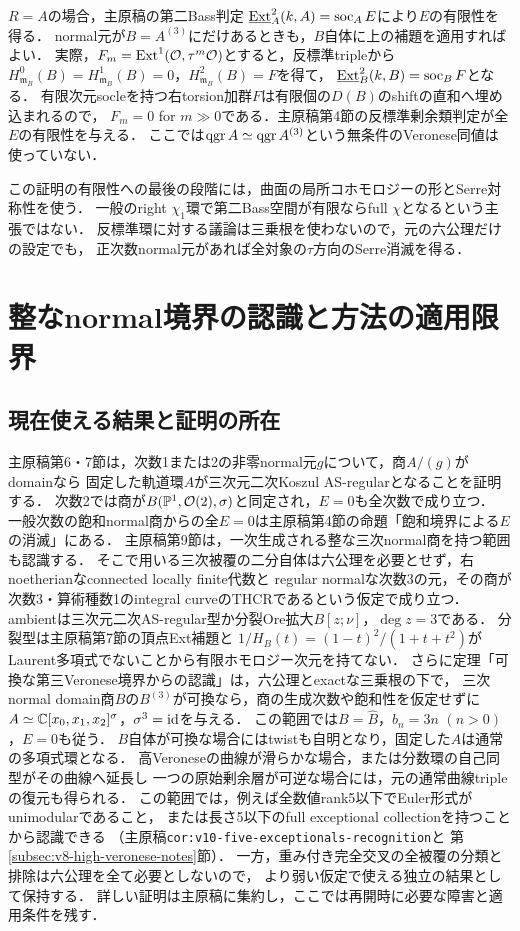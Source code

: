 \documentclass[11pt,a4paper]{ltjsarticle}
\begin{document}
$R=A$の場合，主原稿の第二Bass判定
$\underline{\operatorname{Ext}}^2_A(k,A)=\operatorname{soc}_A E$により$E$の有限性を得る．
normal元が$B=A^{(3)}$にだけあるときも，$B$自体に上の補題を適用すればよい．
実際，$F_m=\operatorname{Ext}^1(\mathcal O,\tau^m\mathcal O)$とすると，反標準tripleから
$H^0_{\mathfrak m_B}(B)=H^1_{\mathfrak m_B}(B)=0$，$H^2_{\mathfrak m_B}(B)=F$を得て，
$\underline{\operatorname{Ext}}^2_B(k,B)=\operatorname{soc}_B F$となる．
有限次元socleを持つ右torsion加群$F$は有限個の$D(B)$のshiftの直和へ埋め込まれるので，
$F_m=0$ for $m\gg0$である．主原稿第4節の反標準剰余類判定が全$E$の有限性を与える．
ここでは$\operatorname{qgr} A\simeq\operatorname{qgr} A^{(3)}$という無条件のVeronese同値は使っていない．

この証明の有限性への最後の段階には，曲面の局所コホモロジーの形とSerre対称性を使う．
一般のright $\chi_1$環で第二Bass空間が有限ならfull $\chi$となるという主張ではない．
反標準環に対する議論は三乗根を使わないので，元の六公理だけの設定でも，
正次数normal元があれば全対象の$\tau$方向のSerre消滅を得る．


\section{整なnormal境界の認識と方法の適用限界}\label{sec:normal-boundary-limits}

\subsection{現在使える結果と証明の所在}
主原稿第6・7節は，次数1または2の非零normal元$g$について，商$A/(g)$がdomainなら
固定した軌道環$A$が三次元二次Koszul AS-regularとなることを証明する．
次数2では商が$B(\mathbb P^1,\mathcal O(2),\sigma)$と同定され，$E=0$も全次数で成り立つ．
一般次数の飽和normal商からの全$E=0$は主原稿第4節の命題「飽和境界による$E$の消滅」にある．
主原稿第9節は，一次生成される整な三次normal商を持つ範囲も認識する．
そこで用いる三次被覆の二分自体は六公理を必要とせず，右noetherianなconnected locally finite代数と
regular normalな次数3の元，その商が次数3・算術種数1のintegral curveのTHCRであるという仮定で成り立つ．
ambientは三次元二次AS-regular型か分裂Ore拡大$B[z;\nu]$，$\deg z=3$である．
分裂型は主原稿第7節の頂点Ext補題と
$1/H_B(t)=(1-t)^2/(1+t+t^2)$がLaurent多項式でないことから有限ホモロジー次元を持てない．
さらに定理「可換な第三Veronese境界からの認識」は，六公理とexactな三乗根の下で，
三次normal domain商$B$の$B^{(3)}$が可換なら，商の生成次数や飽和性を仮定せずに
$A\simeq\mathbb C[x_0,x_1,x_2]^\sigma$，$\sigma^3=\operatorname{id}$を与える．
この範囲では$B=\widehat B$，$b_n=3n$ $(n>0)$，$E=0$も従う．
$B$自体が可換な場合にはtwistも自明となり，固定した$A$は通常の多項式環となる．
高Veroneseの曲線が滑らかな場合，または分数環の自己同型がその曲線へ延長し
一つの原始剰余層が可逆な場合には，元の通常曲線tripleの復元も得られる．
この範囲では，例えば全数値rank5以下でEuler形式がunimodularであること，
または長さ5以下のfull exceptional collectionを持つことから認識できる
（主原稿\texttt{cor:v10-five-exceptionals-recognition}と
第\ref{subsec:v8-high-veronese-notes}節）．
一方，重み付き完全交叉の全被覆の分類と排除は六公理を全て必要としないので，
より弱い仮定で使える独立の結果として保持する．
詳しい証明は主原稿に集約し，ここでは再開時に必要な障害と適用条件を残す．
\end{document}
